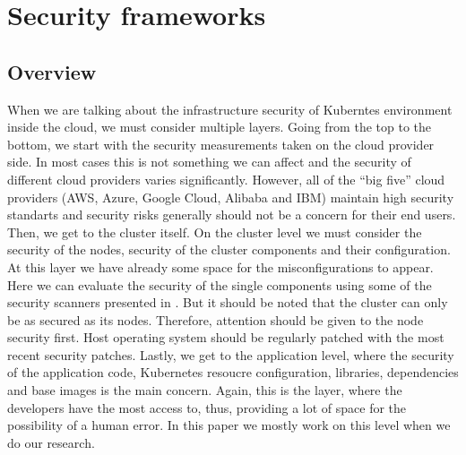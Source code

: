 \section{Security frameworks}

\subsection{Overview}

When we are talking about the infrastructure security of Kuberntes environment inside the cloud, we must consider multiple layers. Going from the top to the bottom, we start with the security measurements taken on the cloud provider side. In most cases this is not something we can affect and the security of different cloud providers varies significantly. However, all of the ``big five'' cloud providers (AWS, Azure, Google Cloud, Alibaba and IBM) maintain high security standarts and security risks generally should not be a concern for their end users. Then, we get to the cluster itself. On the cluster level we must consider the security of the nodes, security of the cluster components and their configuration. At this layer we have already some space for the misconfigurations to appear. Here we can evaluate the security of the single components using some of the security scanners presented in . But it should be noted that the cluster can only be as secured as its nodes. Therefore, attention should be given to the node security first. Host operating system should be regularly patched with the most recent security patches. Lastly, we get to the application level, where the security of the application code, Kubernetes resoucre configuration, libraries, dependencies and base images is the main concern. Again, this is the layer, where the developers have the most access to, thus, providing a lot of space for the possibility of a human error. In this paper we mostly work on this level when we do our research.

